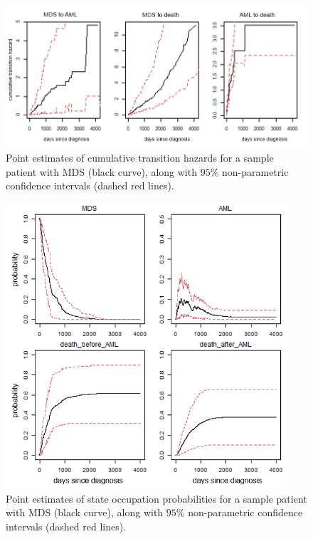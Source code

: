     \begin{figure}[h] 
    \centering         
    \includegraphics[width=12.5cm, angle=0]{figures/patient78_cumhaz_final.png} %
    \caption{Point estimates of cumulative transition hazards for a sample patient with MDS (black curve), along with $95\%$ non-parametric confidence intervals (dashed red lines).}      
    \label{fig:patient78_cumhaz} %
    \end{figure} 
    
    \begin{figure}[h] 
    \centering         
    \includegraphics[width=10.5cm, angle=0]{figures/patient78_transProbs_final.png} %
    \caption{Point estimates of state occupation probabilities for a sample patient with MDS (black curve), along with $95\%$ non-parametric confidence intervals (dashed red lines).}      
    \label{fig:patient78_transProbs} %
    \end{figure} 
    
